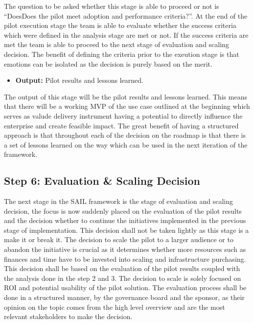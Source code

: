 \documentclass[]{imc-inf}
\def\tightlist{}
\begin{document}
The question to be asked whether this stage is able to proceed or not is
``DoesDoes the pilot meet adoption and performance criteria?''. At the
end of the pilot execution stage the team is able to evaluate whether
the success criteria which were defined in the analysis stage are met or
not. If the success criteria are met the team is able to proceed to the
next stage of evaluation and scaling decision. The benefit of defining
the criteria prior to the exeution stage is that emotions can be
isolated as the decision is purely based on the merit.

\begin{itemize}
	\tightlist
	\item
	\textbf{Output:} Pilot results and lessons learned.
\end{itemize}

The output of this stage will be the pilot results and lessons learned.
This means that there will be a working MVP of the use case outlined at
the beginning which serves as valude delivery instrument having a
potential to directly influence the enterprise and create feasible
impact. The great benefit of having a structured approach is that
throughout each of the decision on the roadmap is that there is a set of
lessons learned on the way which can be used in the next iteration of
the framework.

\subsection{Step 6: Evaluation \& Scaling
	Decision}\label{step-6-evaluation-scaling-decision}

The next stage in the SAIL framework is the stage of evaluation and
scaling decision, the focus is now suddenly placed on the evaluation of
the pilot results and the decision whether to continue the initiatives
implemented in the previous stage of implementation. This decision shall
not be taken lightly as this stage is a make it or break it. The
decision to scale the pilot to a larger audience or to abandon the
initiative is crucial as it determines whether more resources such as
finances and time have to be invested into scaling and infrastructure
purchasing. This decision shall be based on the evaluation of the pilot
results coupled with the analysis done in the step 2 and 3. The decision
to scale is solely focused on ROI and potential usability of the pilot
solution. The evaluation process shall be done in a structured manner,
by the governance board and the sponsor, as their opinion on the topic
comes from the high level overview and are the most relevant
stakeholders to make the decision.
\end{document}
